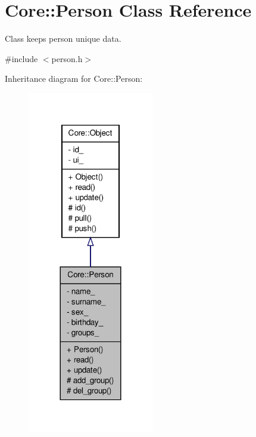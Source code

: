 \hypertarget{classCore_1_1Person}{
\section{Core::Person Class Reference}
\label{d9/d71/classCore_1_1Person}
}


Class keeps person unique data.  




{\ttfamily \#include $<$person.h$>$}



Inheritance diagram for Core::Person:
\nopagebreak
\begin{figure}[H]
\begin{center}
\leavevmode
\includegraphics[width=156pt]{d0/dc4/classCore_1_1Person__inherit__graph}
\end{center}
\end{figure}


